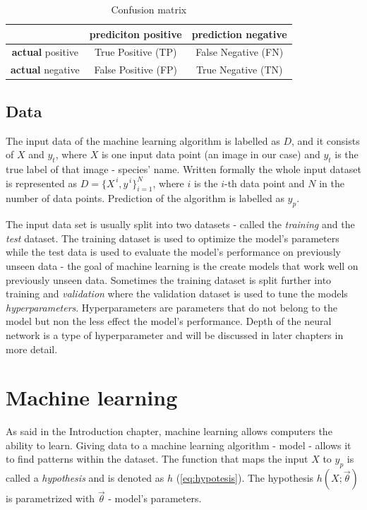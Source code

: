 \documentclass[times, utf8, diplomski]{fer}
\begin{document}
\begin{table}
\centering
\caption{Confusion matrix}
\label{tb:confusion_matrix}
\begin{tabular}{|c|c|c|}
\hline 
 & \textbf{prediciton} positive & \textbf{prediction} negative \\ 
\hline 
\textbf{actual} positive & True Positive (TP) & False Negative (FN) \\ 
\hline 
\textbf{actual} negative & False Positive (FP) & True Negative (TN) \\ 
\hline 
\end{tabular}
\end{table}

\subsection{Data} \label{se:data}
The input data of the machine learning algorithm is labelled as $D$, and it consists of $X$ and $y_{t}$, where $X$ is one input data point (an image in our case) and $y_{t}$ is the true label of that image - species' name. Written formally the whole input dataset is represented as $D = \{{X}^{\,i},y^{\,i}\}^{N}_{i=1}$, where $i$ is the $i$-th data point and $N$ in the number of data points. Prediction of the algorithm is labelled as $y_{p}$.

The input data set is usually split into two datasets - called the \textit{training} and the \textit{test} dataset. The training dataset is used to optimize the model's parameters while the test data is used to evaluate the model's performance on previously unseen data - the goal of machine learning is the create models that work well on previously unseen data. Sometimes the training dataset is split further into training and \textit{validation} where the validation dataset is used to tune the models \textit{hyperparameters}. Hyperparameters are parameters that do not belong to the model but non the less effect the model's performance. Depth of the neural network is a type of hyperparameter and will be discussed in later chapters in more detail.


\section{Machine learning}
\label{se:machine_learning}

As said in the Introduction chapter, machine learning allows computers the ability to learn. Giving data to a machine learning algorithm - model - allows it to find patterns within the dataset. The function that maps the input $X$ to $y_p$ is called a \textit{hypothesis} and is denoted as $h$ (\ref{eq:hypotesis}). The hypothesis $h(X ; \vec{\theta})$ is parametrized with $\vec{\theta}$ - model's parameters.
\end{document}
